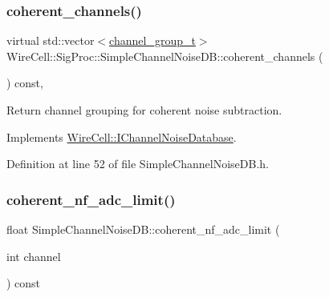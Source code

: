 \subsubsection{\texorpdfstring{coherent\+\_\+channels()}{coherent\_channels()}}
{\footnotesize\ttfamily virtual std\+::vector$<$\hyperlink{class_wire_cell_1_1_i_channel_noise_database_a7fedd6ab67ba4e7eeb8cf182cc9dc6b1}{channel\+\_\+group\+\_\+t}$>$ Wire\+Cell\+::\+Sig\+Proc\+::\+Simple\+Channel\+Noise\+D\+B\+::coherent\+\_\+channels (\begin{DoxyParamCaption}{ }\end{DoxyParamCaption}) const\hspace{0.3cm}{\ttfamily [inline]}, {\ttfamily [virtual]}}



Return channel grouping for coherent noise subtraction. 



Implements \hyperlink{class_wire_cell_1_1_i_channel_noise_database_a0f220478d9d7ed3c913b925e84b39138}{Wire\+Cell\+::\+I\+Channel\+Noise\+Database}.



Definition at line 52 of file Simple\+Channel\+Noise\+D\+B.\+h.

\mbox{\label{class_wire_cell_1_1_sig_proc_1_1_simple_channel_noise_d_b_a5c9dfedd62780fe11dafaa0739876803}} 
\subsubsection{\texorpdfstring{coherent\+\_\+nf\+\_\+adc\+\_\+limit()}{coherent\_nf\_adc\_limit()}}
{\footnotesize\ttfamily float Simple\+Channel\+Noise\+D\+B\+::coherent\+\_\+nf\+\_\+adc\+\_\+limit (\begin{DoxyParamCaption}\item[{int}]{channel }\end{DoxyParamCaption}) const\hspace{0.3cm}{\ttfamily [virtual]}}




